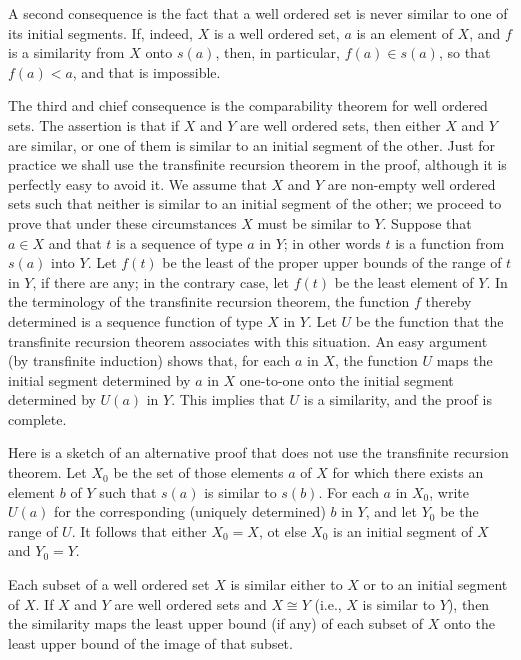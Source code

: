 A second consequence is the fact that a well ordered set is never similar to one of its initial segments. If, indeed, $X$ is a well ordered set, $a$ is an element of $X$, and $f$ is a similarity from $X$ onto $s(a)$, then, in particular, $f(a) \in s(a)$, so that $f(a) < a$, and that is impossible. 

The third and chief consequence is the comparability theorem for well ordered sets. The assertion is that if $X$ and $Y$ are well ordered sets, then either $X$ and $Y$ are similar, or one of them is similar to an initial segment of the other. Just for practice we shall use the transfinite recursion theorem in the proof, although it is perfectly easy to avoid it. We assume that $X$ and $Y$ are non-empty well ordered sets such that neither is similar to an initial segment of the other; we proceed to prove that under these circumstances $X$ must be similar to $Y$. Suppose that $a \in X$ and that $t$ is a sequence of type $a$ in $Y$; in other words $t$ is a function from $s(a)$ into $Y$. Let $f(t)$ be the least of the proper upper bounds of the range of $t$ in $Y$, if there are any; in the contrary case, let $f(t)$ be the least element of $Y$. In the terminology of the transfinite recursion theorem, the function $f$ thereby determined is a sequence function of type $X$ in $Y$. Let $U$ be the function that the transfinite recursion theorem associates with this situation. An easy argument (by transfinite induction) shows that, for each $a$ in $X$, the function $U$ maps the initial segment determined by $a$ in $X$ one-to-one onto the initial segment determined by $U(a)$ in $Y$. This implies that $U$ is a similarity, and the proof is complete. 

Here is a sketch of an alternative proof that does not use the transfinite recursion theorem. Let $X_{0}$ be the set of those elements $a$ of $X$ for which there exists an element $b$ of $Y$ such that $s(a)$ is similar to $s(b)$. For each $a$ in $X_{0}$, write $U(a)$ for the corresponding (uniquely determined) $b$ in $Y$, and let $Y_{0}$ be the range of $U$. It follows that either $X_{0} = X$, ot else $X_{0}$ is an initial segment of $X$ and $Y_{0} = Y$. 

\begin{exercise} Each subset of a well ordered set $X$ is similar either to $X$ or to an initial segment of $X$. If $X$ and $Y$ are well ordered sets and $X \cong Y$ (i.e., $X$ is similar to $Y$), then the similarity maps the least upper bound (if any) of each subset of $X$ onto the least upper bound of the image of that subset.
\end{exercise}
